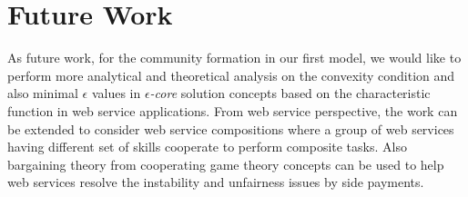 



\section{Future Work}

As future work, for the community formation in our first model, we would like to perform more analytical and theoretical analysis on the convexity condition and also minimal
$\epsilon$ values in \emph{$\epsilon$-core} solution concepts based on the characteristic function in web service applications. From web service perspective, the work can be extended to consider web service compositions where a group of web services having different set of skills cooperate to perform composite tasks. Also bargaining theory from cooperating game theory concepts can be used to help web services resolve the instability and unfairness issues by side payments.

